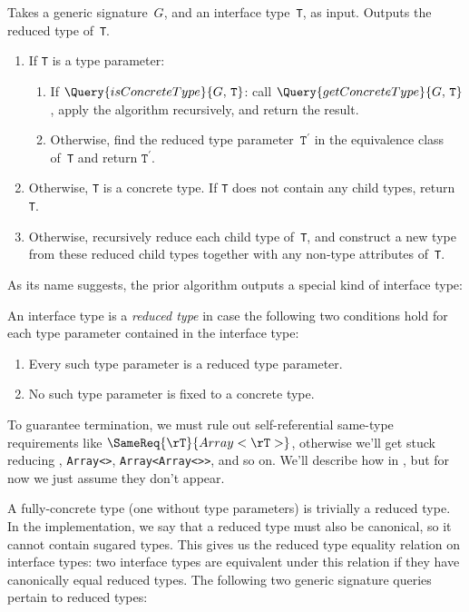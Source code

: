 \documentclass[../generics]{subfiles}
\begin{document}
\begin{algorithm}\label{reduced type algorithm}
Takes a generic signature~$G$, and an interface type~\texttt{T}, as input. Outputs the reduced type of~\texttt{T}.
\begin{enumerate}
\item If \texttt{T} is a type parameter:
\begin{enumerate}
\item If $\Query{isConcreteType}{G,\,\texttt{T}}$: call $\Query{getConcreteType}{G,\,\texttt{T}}$, apply the algorithm recursively, and return the result.
\item Otherwise, find the reduced type parameter~$\texttt{T}^\prime$ in the equivalence class of~\texttt{T} and return $\texttt{T}^\prime$.
\end{enumerate}
\item Otherwise, \texttt{T} is a concrete type. If \texttt{T} does not contain any child types, return \texttt{T}.
\item Otherwise, recursively reduce each child type of~\texttt{T}, and construct a new type from these reduced child types together with any non-type attributes of~\texttt{T}.
\end{enumerate}
\end{algorithm}

As its name suggests, the prior algorithm outputs a special kind of interface type:

\begin{definition}
An interface type is a \emph{reduced type} in case the following two conditions hold for each type parameter contained in the interface type:
\begin{enumerate}
\item Every such type parameter is a reduced type parameter.
\item No such type parameter is fixed to a concrete type.
\end{enumerate}
\end{definition}

To guarantee termination, we must rule out self-referential same-type requirements like $\SameReq{\rT}{Array<\rT>}$, otherwise we'll get stuck reducing \rT, \texttt{Array<\rT>}, \texttt{Array<Array<\rT>>}, and so on. We'll describe how in , but for now we just assume they don't appear. 

A fully-concrete type (one without type parameters) is trivially a reduced type. In the implementation, we say that a reduced type must also be canonical, so it cannot contain sugared types. This gives us the reduced type equality relation on interface types: two interface types are equivalent under this relation if they have canonically equal reduced types. The following two generic signature queries pertain to reduced types:
\end{document}
